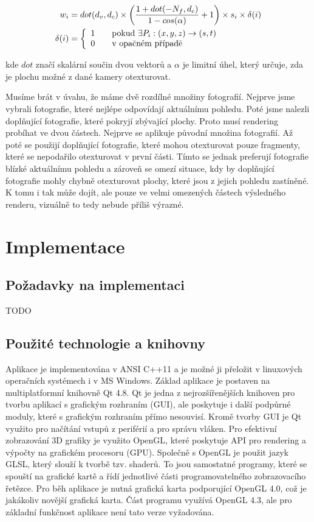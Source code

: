 \documentclass[11pt,twoside,a4paper]{book}
\begin{document}
\begin{align}
\label{eq:weight-scheme}
w_i &= dot(d_v, d_c) \times \left(\frac{1 + dot(-N_f, d_c)}{1 - cos(\alpha)} + 1\right) \times s_i \times \delta(i)\\
\delta(i) &= \left\{
  \begin{array}{l l}
    1 & \quad \text{pokud~$\exists P_i:(x, y, z) \to (s, t)$}\\
    0 & \quad \text{v opačném případě}
  \end{array} \right.
\end{align}

\noindent kde $dot$ značí skalární součin dvou vektorů a $\alpha$ je limitní úhel, který určuje, zda je plochu možné z dané kamery otexturovat.

Musíme brát v úvahu, že máme dvě rozdílné množiny fotografií. Nejprve jsme vybrali fotografie, které nejlépe odpovídají aktuálnímu pohledu. Poté jsme nalezli doplňující fotografie, které pokryjí zbývající plochy. Proto musí rendering probíhat ve dvou částech. Nejprve se aplikuje původní množina fotografií. Až poté se použijí doplňující fotografie, které mohou otexturovat pouze fragmenty, které se nepodařilo otexturovat v první části. Tímto se jednak preferují fotografie blízké aktuálnímu pohledu a zároveň se omezí situace, kdy by doplňující fotografie mohly chybně otexturovat plochy, které jsou z jejich pohledu zastíněné. K tomu i tak může dojít, ale pouze ve velmi omezených částech výsledného renderu, vizuálně to tedy nebude příliš výrazné. 


\chapter{Implementace}

\section{Požadavky na implementaci}

TODO

\section{Použité technologie a knihovny}
Aplikace je implementována v ANSI C++11 a je možné ji přeložit v linuxových operačních systémech i v MS Windows. Základ aplikace je postaven na multiplatformní knihovně Qt 4.8. Qt je jedna z nejrozšířenějších knihoven pro tvorbu aplikací s grafickým rozhraním (GUI), ale poskytuje i další podpůrné moduly, které s grafickým rozhraním přímo nesouvisí. Kromě tvorby GUI je Qt využito pro načítání vstupů z periférií a pro správu vláken. Pro efektivní zobrazování 3D grafiky je využito OpenGL, které poskytuje API pro rendering a výpočty na grafickém procesoru (GPU). Společně s OpenGL je použit jazyk GLSL, který slouží k tvorbě tzv. shaderů. To jsou samostatné programy, které se spouští na grafické kartě a řídí jednotlivé části programovatelného zobrazovacího řetězce. Pro běh aplikace je nutná grafická karta podporující OpenGL 4.0, což je jakákoliv novější grafická karta. Část programu využívá OpenGL 4.3, ale pro základní funkčnost aplikace není tato verze vyžadována. 
\end{document}
